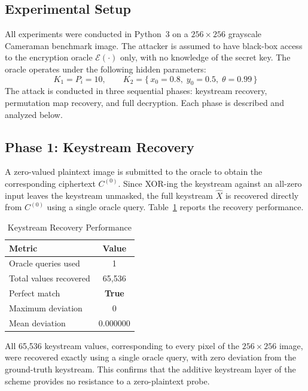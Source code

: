 \subsection{Experimental Setup}

All experiments were conducted in Python~3 on a $256 \times 256$ grayscale Cameraman benchmark image. The attacker is assumed to have black-box access to the encryption oracle $\mathcal{E}(\cdot)$ only, with no knowledge of the secret key. The oracle operates under the following hidden parameters:
\[
K_1 = P_i = 10, \qquad K_2 = \{\,x_0 = 0.8,\; y_0 = 0.5,\; \theta = 0.99\,\}
\]
The attack is conducted in three sequential phases: keystream recovery, permutation map recovery, and full decryption. Each phase is described and analyzed below.

\subsection{Phase 1: Keystream Recovery}

A zero-valued plaintext image is submitted to the oracle to obtain the corresponding ciphertext $C^{(0)}$. Since XOR-ing the keystream against an all-zero input leaves the keystream unmasked, the full keystream $\hat{X}$ is recovered directly from $C^{(0)}$ using a single oracle query. Table~\ref{tab:keystream} reports the recovery performance.

\begin{table}[t]
\centering
\caption{Keystream Recovery Performance}
\label{tab:keystream}
\begin{tabular}{@{}lc@{}}
\toprule
\textbf{Metric} & \textbf{Value} \\
\midrule
Oracle queries used    & 1 \\
Total values recovered & 65,536 \\
Perfect match          & \textbf{True} \\
Maximum deviation      & 0 \\
Mean deviation         & 0.000000 \\
\bottomrule
\end{tabular}
\end{table}

All 65,536 keystream values, corresponding to every pixel of the $256 \times 256$ image, were recovered exactly using a single oracle query, with zero deviation from the ground-truth keystream. This confirms that the additive keystream layer of the scheme provides no resistance to a zero-plaintext probe.

